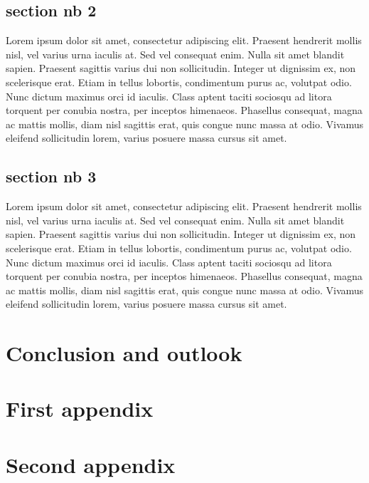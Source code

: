 \documentclass[a4paper, 11pt]{report}
\begin{document}
\section{section nb 2}

Lorem ipsum dolor sit amet, consectetur adipiscing elit.
Praesent hendrerit mollis nisl, vel varius urna iaculis at.
Sed vel consequat enim.
Nulla sit amet blandit sapien.
Praesent sagittis varius dui non sollicitudin.
Integer ut dignissim ex, non scelerisque erat.
Etiam in tellus lobortis, condimentum purus ac, volutpat odio.
Nunc dictum maximus orci id iaculis.
Class aptent taciti sociosqu ad litora torquent per conubia nostra, 
per inceptos himenaeos.
Phasellus consequat, magna ac mattis mollis, diam nisl sagittis erat, 
quis congue nunc massa at odio.
Vivamus eleifend sollicitudin lorem, varius posuere massa cursus sit 
amet.

\section{section nb 3}

Lorem ipsum dolor sit amet, consectetur adipiscing elit.
Praesent hendrerit mollis nisl, vel varius urna iaculis at.
Sed vel consequat enim.
Nulla sit amet blandit sapien.
Praesent sagittis varius dui non sollicitudin.
Integer ut dignissim ex, non scelerisque erat.
Etiam in tellus lobortis, condimentum purus ac, volutpat odio.
Nunc dictum maximus orci id iaculis.
Class aptent taciti sociosqu ad litora torquent per conubia nostra, 
per inceptos himenaeos.
Phasellus consequat, magna ac mattis mollis, diam nisl sagittis erat, 
quis congue nunc massa at odio.
Vivamus eleifend sollicitudin lorem, varius posuere massa cursus sit 
amet.


\chapter*{Conclusion and outlook}


\newpage                 %



\appendix


\chapter{First appendix}

\chapter{Second appendix}
\end{document}
